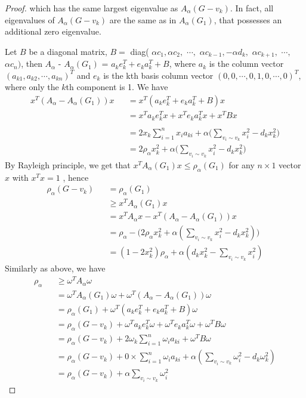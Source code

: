 \documentclass[amsthm]{elsart}
\begin{document}
\begin{proof}
which has the same largest eigenvalue as $A_\alpha(G - v_k)$. In fact, all eigenvalues of $A_\alpha(G - v_k)$ are the same as in
$A_\alpha(G_1)$, that possesses an additional zero eigenvalue.


Let $B$ be a diagonal matrix, $B =$ diag(
$\alpha c_1, \alpha c_2, $ $ \cdots,$ $ \alpha c_{k-1}, - \alpha d_{k}, $ $ \alpha c_{k+1},$ $  \cdots, $ $\alpha c_n )$,
 then $A_\alpha$ - $A_\alpha(G_1)$ = $a_ke_k^T + e_ka_k^T + B$, where $a_k$ is the column vector $(a_{k1}, a_{k2}, \cdots , a_{kn})^T$ and $e_k$ is the kth basis column vector $(0, 0, \cdots , 0, 1, 0, \cdots , 0)^T$,
 where only the $k$th component is 1. We have \\
\begin{eqnarray*}
x^T(A_\alpha - A_\alpha(G_1))x
&&= x^T (a_k e_k^T + e_k a_k^T + B) x
\\ &&= x^T a_k e_k^T x + x^T e_k a_k^T x + x^T B x \\
\\ &&= 2x_k \sum \limits_{i=1}^{n}x_ia_{ki} + \alpha \big(\sum \limits_{v_i \sim v_k}^{} x_i^2 - d_k x_k^2 \big)
\\ &&= 2 \rho_\alpha x_k^2 + \alpha \big(\sum \limits_{v_i \sim v_k}^{} x_i^2 - d_k x_k^2 \big) 
\end{eqnarray*}
\qquad By Rayleigh principle, we get that  $x^{T}A_\alpha(G_1)x  \leqslant  \rho_\alpha(G_1)$ for any $n \times 1$ vector $x$ with $x^{T} x = 1$
, hence 
\begin{eqnarray*}
\rho_\alpha(G - v_k)
&&= \rho_\alpha(G_1)
\\ &&\geqslant x^T A_\alpha(G_1) x
\\ &&= x^T A_\alpha x - x^T(A_\alpha - A_\alpha(G_1))x
\\ &&= \rho_\alpha - \Big( 2 \rho_\alpha x_k^2 + \alpha (\sum \limits_{v_i \sim v_k}^{} x_i^2 - d_k x_k^2 )\Big)
\\ &&= ( 1 -2 x_k^2)\rho_\alpha + \alpha (d_k x_k^2 - \sum \limits_{v_i \sim v_k}^{} x_i^2 )
\end{eqnarray*}
Similarly as above, we have \\
\begin{eqnarray*}
\rho_\alpha
&&\geqslant \omega ^T A_\alpha \omega
\\ &&= \omega ^T A_\alpha(G_1) \omega + \omega^T (A_\alpha - A_\alpha(G_1)) \omega
\\ &&= \rho_\alpha(G_1) + \omega^T (a_k e_k^T + e_k a_k^T + B) \omega
\\ &&= \rho_\alpha(G - v_k) + \omega^T a_k e_k^T \omega + \omega^T e_k a_k^T \omega + \omega^T B \omega
\\ &&= \rho_\alpha(G - v_k)
  + 2\omega_k \sum \limits_{i=1}^{n}\omega_i a_{ki}
  + \omega^T B \omega
\\ &&= \rho_\alpha(G - v_k)
  + 0 \times \sum \limits_{i=1}^{n}\omega_i a_{ki}
  + \alpha  (\sum \limits_{v_i \sim v_k}^{} \omega_i^2 - d_k \omega_k^2 )
\\ &&= \rho_\alpha(G - v_k) + \alpha \sum \limits_{v_i \sim v_k}^{} \omega_i^2
\end{eqnarray*}


\end{proof}
\end{document}
